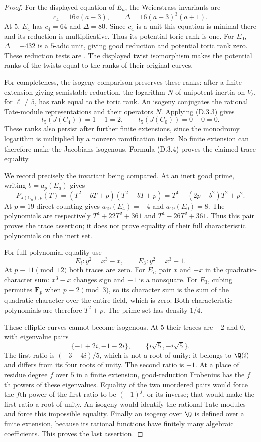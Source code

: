 \begin{proof}
For the displayed equation of $E_a$, the Weierstrass invariants
are
\[
 c_4=16a(a-3),\qquad
 \Delta=16(a-3)^3(a+1).
 \tag{D.3.5}
\]
At $5$, $E_4$ has $c_4=64$ and $\Delta=80$. Since $c_4$ is a
unit this equation is minimal there and its reduction is
multiplicative. Thus its potential toric rank is one.
For $E_0$, $\Delta=-432$ is a $5$-adic unit, giving good
reduction and potential toric rank zero. These reduction tests
are \cite[II, \S3]{AgentMilneEC}. The displayed twist
isomorphism makes the potential ranks of the twists equal to
the ranks of their original curves.

For completeness, the isogeny comparison preserves these
ranks: after a finite extension giving semistable reduction,
the logarithm $N$ of unipotent inertia on $V_\ell$, for
$\ell\ne5$, has rank equal to the toric rank. An isogeny
conjugates the rational Tate-module representations and their
operators $N$. Applying (D.3.3) gives
\[
 t_5(J(C_4))=1+1=2,\qquad t_5(J(C_0))=0+0=0.
 \tag{D.3.6}
\]
These ranks also persist after further finite extensions, since
the monodromy logarithm is multiplied by a nonzero ramification
index. No finite extension can therefore make the Jacobians
isogenous. Formula (D.3.4) proves the claimed trace equality.

We record precisely the invariant being compared. At an inert
good prime, writing $b=a_p(E_a)$ gives
\[
 P_{J(C_a),p}(T)
  =(T^2-bT+p)(T^2+bT+p)
  =T^4+(2p-b^2)T^2+p^2.
 \tag{D.3.7}
\]
At $p=19$ direct counting gives $a_{19}(E_4)=-4$ and
$a_{19}(E_0)=8$. The polynomials are respectively
$T^4+22T^2+361$ and $T^4-26T^2+361$.
Thus this pair proves the trace assertion; it does not prove
equality of their full characteristic polynomials on the inert
set.

For full-polynomial equality use
\[
 E_i:y^2=x^3-x,
 \qquad E_3:y^2=x^3+1.
 \tag{D.3.8}
\]
At $p\equiv11\pmod{12}$ both traces are zero. For $E_i$, pair
$x$ and $-x$ in the quadratic-character sum: $x^3-x$ changes
sign and $-1$ is a nonsquare. For $E_3$, cubing permutes
$\mathbf F_p$ when $p\equiv2\pmod3$, so its character sum is
the sum of the quadratic character over the entire field,
which is zero. Both characteristic polynomials are therefore
$T^2+p$. The prime set has density $1/4$.

These elliptic curves cannot become isogenous. At $5$ their
traces are $-2$ and $0$, with eigenvalue pairs
\[
 \{-1+2i,-1-2i\},\qquad
 \{i\sqrt5,-i\sqrt5\}.
\]
The first ratio is $(-3-4i)/5$, which is not a root of unity:
it belongs to $\Q(i)$ and differs from its four roots of unity.
The second ratio is $-1$. At a place of residue degree $f$
over $5$ in a finite extension, good-reduction Frobenius has
the $f$th powers of these eigenvalues. Equality of the two
unordered pairs would force the $f$th power of the first
ratio to be $(-1)^f$, or its inverse; that would make the first
ratio a root of unity. An isogeny would identify the rational
Tate modules and force this impossible equality. Finally an
isogeny over $\bar\Q$ is defined over a finite extension,
because its rational functions have finitely many algebraic
coefficients. This proves the last assertion.
\end{proof}


